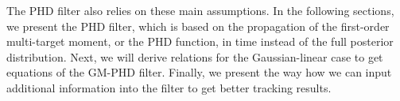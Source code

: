 The PHD filter also relies on these main assumptions. In the following sections, we present the PHD filter, which is based on the propagation of the first-order multi-target moment, or the PHD function, in time instead of the full posterior distribution. Next, we will derive relations for the Gaussian-linear case to get equations of the GM-PHD filter. Finally, we present the way how we can input additional information into the filter to get better tracking results.
